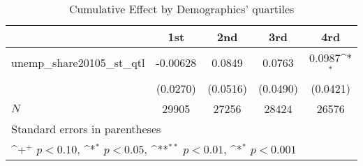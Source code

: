 \begin{table}[htbp]\centering
\def\sym#1{\ifmmode^{#1}\else\(^{#1}\)\fi}
\caption{Cumulative Effect by Demographics' quartiles}
\begin{tabular}{l*{4}{c}}
\hline\hline
            &\multicolumn{1}{c}{1st}&\multicolumn{1}{c}{2nd}&\multicolumn{1}{c}{3rd}&\multicolumn{1}{c}{4rd}\\
\hline
unemp\_share20105\_st\_qtl&    -0.00628       &      0.0849       &      0.0763       &      0.0987\sym{*}\\
            &    (0.0270)       &    (0.0516)       &    (0.0490)       &    (0.0421)       \\
\hline
\(N\)       &       29905       &       27256       &       28424       &       26576       \\
\hline\hline
\multicolumn{5}{l}{\footnotesize Standard errors in parentheses}\\
\multicolumn{5}{l}{\footnotesize \sym{+} \(p<0.10\), \sym{*} \(p<0.05\), \sym{**} \(p<0.01\), \sym{*} \(p<0.001\)}\\
\end{tabular}
\end{table}
